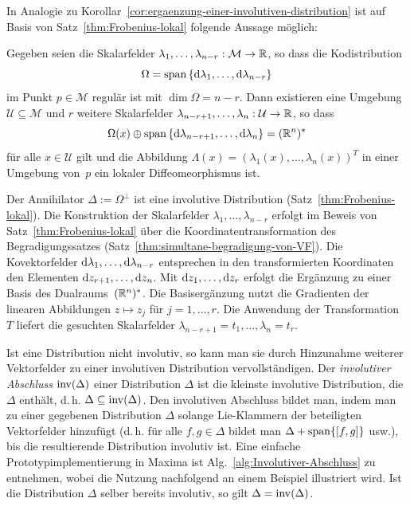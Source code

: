In Analogie zu Korollar~\ref{cor:ergaenzung-einer-involutiven-distribution}
ist auf Basis von Satz~\ref{thm:Frobenius-lokal} folgende Aussage
möglich:
\begin{corollary}
\label{cor:ergaenzung-einer-kodistribution-integrierbar}Gegeben seien
die Skalarfelder $\lambda_{1},\ldots,\lambda_{n-r}:\mathcal{M}\to{\mathbb{R}}$,
so dass die Kodistribution
\[
\Omega={\operatorname{span}}\left\{ {\mathrm{d}}\lambda_{1},\ldots,{\mathrm{d}}\lambda_{n-r}\right\} 
\]
im Punkt $p\in\mathcal{M}$ regulär ist mit $\dim\Omega=n-r$. Dann
existieren eine Umgebung $\mathcal{U}\subseteq\mathcal{M}$ und $r$
weitere Skalarfelder $\lambda_{n-r+1},\ldots,\lambda_{n}:\mathcal{U}\to{\mathbb{R}}$,
so dass 
\[
\Omega(x)\oplus{\operatorname{span}}\left\{ {\mathrm{d}}\lambda_{n-r+1},\ldots,{\mathrm{d}}\lambda_{n}\right\} =({\mathbb{R}}^{n})^{*}
\]
für alle $x\in\mathcal{U}$ gilt und die Abbildung $\Lambda(x)=(\lambda_{1}(x),\ldots,\lambda_{n}(x))^{T}$
in einer Umgebung von~$p$ ein lokaler Diffeomeorphismus ist.
\end{corollary}
\begin{svmultproof2}
Der Annihilator $\Delta:=\Omega^{\perp}$ ist eine involutive Distribution
(Satz~\ref{thm:Frobenius-lokal}). Die Konstruktion der Skalarfelder
$\lambda_{1},\ldots,\lambda_{n-r}$ erfolgt im Beweis von Satz~\ref{thm:Frobenius-lokal}
über die Koordinatentransformation des Begradigungssatzes (Satz~\ref{thm:simultane-begradigung-von-VF}).
Die Kovektorfelder ${\mathrm{d}}\lambda_{1},\ldots,{\mathrm{d}}\lambda_{n-r}$ entsprechen
in den transformierten Koordinaten den Elementen ${\mathrm{d}} z_{r+1},\ldots,{\mathrm{d}} z_{n}$.
Mit ${\mathrm{d}} z_{1},\ldots,{\mathrm{d}} z_{r}$ erfolgt die Ergänzung zu einer Basis
des Dualraums~$({\mathbb{R}}^{n})^{*}$. Die Basisergänzung nutzt die Gradienten
der linearen Abbildungen $z\mapsto z_{j}$ für $j=1,\ldots,r$. Die
Anwendung der Transformation~$T$ liefert die gesuchten Skalarfelder
$\lambda_{n-r+1}=t_{1},\ldots,\lambda_{n}=t_{r}$.
\end{svmultproof2}

Ist eine Distribution nicht involutiv, so kann man sie durch Hinzunahme
weiterer Vektorfelder zu einer involutiven Distribution vervollständigen.
Der \emph{involutiver Abschluss} ${\operatorname{inv}}(\Delta)$
einer Distribution $\Delta$ ist die kleinste involutive Distribution,
die $\Delta$ enthält, d.\,h. $\Delta\subseteq{\operatorname{inv}}(\Delta)$. Den
involutiven Abschluss bildet man, indem man zu einer gegebenen Distribution
$\Delta$ solange Lie-Klammern der beteiligten Vektorfelder hinzufügt
(d.\,h. für alle $f,g\in\Delta$ bildet man $\Delta+{\operatorname{span}}\{[f,g]\}$
usw.), bis die resultierende Distribution involutiv ist. Eine einfache
Prototypimplementierung in Maxima ist Alg.~\ref{alg:Involutiver-Abschluss}
zu entnehmen, wobei die Nutzung nachfolgend an einem Beispiel illustriert
wird. Ist die Distribution $\Delta$ selber bereits involutiv, so
gilt $\Delta={\operatorname{inv}}(\Delta)$. 

